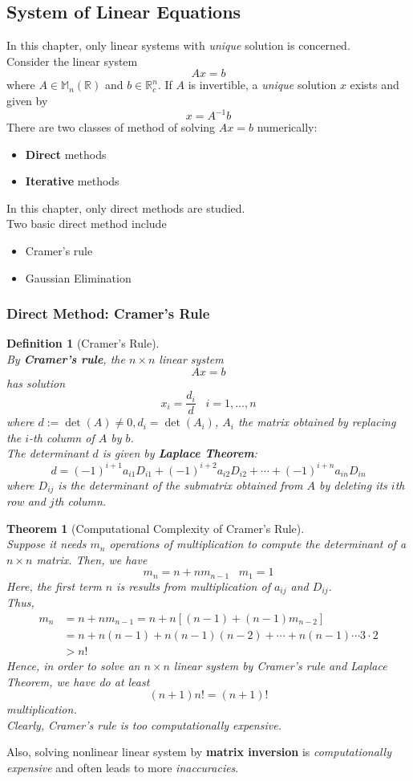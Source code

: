 \documentclass[12pt]{article}
\newtheorem{definition}{Definition}[section]
\newtheorem{theorem}{Theorem}[section]
\theoremstyle{definition}
\begin{document}
\subsection{System of Linear Equations}
In this chapter, only linear systems with \textit{unique} solution is concerned.\\
Consider the linear system
\[
Ax=b
\]
where $A\in\mathbb{M}_{n}(\mathbb{R})$ and $b\in\mathbb{R}_c^n$. If $A$ is invertible, a \textit{unique} solution $x$ exists and given by
\[
x=A^{-1}b
\]
There are two classes of method of solving $Ax=b$ numerically:
\begin{itemize}
  \item \textbf{Direct} methods
  \item \textbf{Iterative} methods
\end{itemize}
In this chapter, only direct methods are studied.\\
Two basic direct method include
\begin{itemize}
  \item Cramer's rule
  \item Gaussian Elimination
\end{itemize}
\subsubsection{Direct Method: Cramer's Rule}
\begin{definition}[Cramer's Rule]
\hfill\\\normalfont By \textbf{Cramer's rule}, the $n\times n$ linear system
\[
Ax=b
\]
has solution
\[
x_i=\frac{d_i}{d} \;\;\; i = 1,\ldots, n
\]
where $d:=\det(A)\neq 0, d_i=\det(A_i)$, $A_i$ the matrix obtained by replacing the $i$-th column of $A$ by $b$.\\
The determinant $d$ is given by \textbf{Laplace Theorem}:
\[
d=(-1)^{i+1}a_{i1}D_{i1}+(-1)^{i+2}a_{i2}D_{i2}+\cdots+(-1)^{i+n}a_{in}D_{in}
\]
where $D_{ij}$ is the determinant of the submatrix obtained from $A$ by deleting its $i$th row and $j$th column.
\end{definition}
\begin{theorem}[Computational Complexity of Cramer's Rule]
\hfill\\\normalfont Suppose it needs $m_n$ operations of multiplication to compute the determinant of a $n\times n$ matrix. Then, we have
\[
m_n=n+nm_{n-1}\;\;\;m_1=1
\]
Here, the first term $n$ is results from multiplication of $a_{ij}$ and $D_{ij}$.\\
Thus,  
\begin{align*}
m_n &=n+nm_{n-1}=n+n[(n-1)+(n-1)m_{n-2}]\\
&=n+n(n-1)+n(n-1)(n-2)+\cdots+n(n-1)\cdots 3\cdot2\\
&>n! 
\end{align*}
Hence, in order to solve an $n\times n$ linear system by Cramer's rule and Laplace Theorem, we have do at least
\[
(n+1)n!=(n+1)!
\]
  multiplication.\\Clearly, Cramer's rule is too \textit{computationally expensive}.
\end{theorem}
Also, solving nonlinear linear system by \textbf{matrix inversion} is \textit{computationally expensive} and often leads to more \textit{inaccuracies}.
\end{document}
